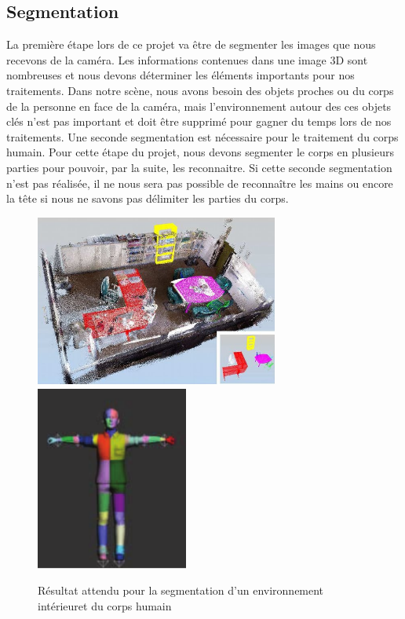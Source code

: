 \subsection{Segmentation}
La première étape lors de ce projet va être de segmenter les images que nous recevons de 
la caméra. Les informations contenues dans une image 3D sont nombreuses et nous devons
déterminer les éléments importants pour nos traitements. Dans notre scène,
nous avons besoin des objets proches ou du corps de la personne en face de la caméra, mais 
l'environnement autour des ces objets clés n'est pas important et doit être supprimé pour
gagner du temps lors de nos traitements.
Une seconde segmentation est nécessaire pour le traitement du corps humain. Pour cette étape du projet,
nous devons segmenter le corps en plusieurs parties pour pouvoir, par la suite, les reconnaitre. Si cette
seconde segmentation n'est pas réalisée, il ne nous sera pas possible de reconnaître les mains ou encore
la tête si nous ne savons pas délimiter les parties du corps.  

\begin{figure}[!ht]
  \begin{center}
    \includegraphics[width=8cm]{image/segmentation.png}
    \includegraphics[width=5cm]{image/bodySegmentation.png}
    \caption[The LOF caption]{Résultat attendu pour la segmentation d'un environnement intérieur\footnotemark et du corps humain}
  \end{center}
\end{figure}
 
